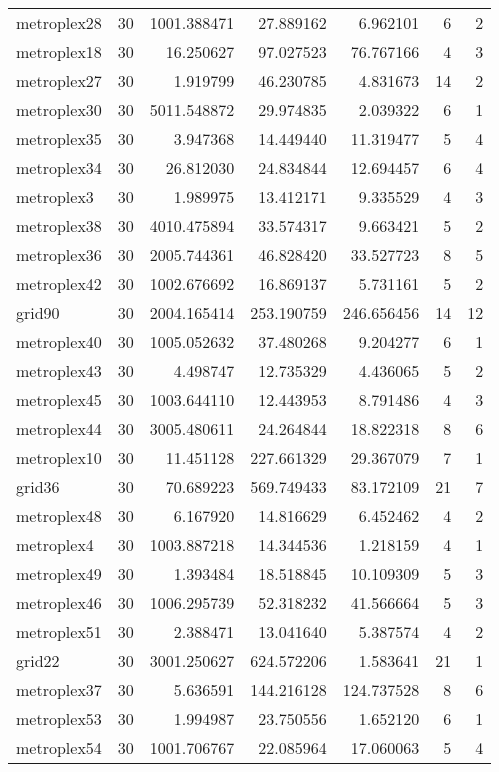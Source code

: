 \begin{longtable}{|l|r|r|r|r|r|r|}
metroplex28 & 30 & 1001.388471 & 27.889162 & 6.962101 & 6 & 2 \\
metroplex18 & 30 & 16.250627 & 97.027523 & 76.767166 & 4 & 3 \\
metroplex27 & 30 & 1.919799 & 46.230785 & 4.831673 & 14 & 2 \\
metroplex30 & 30 & 5011.548872 & 29.974835 & 2.039322 & 6 & 1 \\
metroplex35 & 30 & 3.947368 & 14.449440 & 11.319477 & 5 & 4 \\
metroplex34 & 30 & 26.812030 & 24.834844 & 12.694457 & 6 & 4 \\
metroplex3 & 30 & 1.989975 & 13.412171 & 9.335529 & 4 & 3 \\
metroplex38 & 30 & 4010.475894 & 33.574317 & 9.663421 & 5 & 2 \\
metroplex36 & 30 & 2005.744361 & 46.828420 & 33.527723 & 8 & 5 \\
metroplex42 & 30 & 1002.676692 & 16.869137 & 5.731161 & 5 & 2 \\
grid90 & 30 & 2004.165414 & 253.190759 & 246.656456 & 14 & 12 \\
metroplex40 & 30 & 1005.052632 & 37.480268 & 9.204277 & 6 & 1 \\
metroplex43 & 30 & 4.498747 & 12.735329 & 4.436065 & 5 & 2 \\
metroplex45 & 30 & 1003.644110 & 12.443953 & 8.791486 & 4 & 3 \\
metroplex44 & 30 & 3005.480611 & 24.264844 & 18.822318 & 8 & 6 \\
metroplex10 & 30 & 11.451128 & 227.661329 & 29.367079 & 7 & 1 \\
grid36 & 30 & 70.689223 & 569.749433 & 83.172109 & 21 & 7 \\
metroplex48 & 30 & 6.167920 & 14.816629 & 6.452462 & 4 & 2 \\
metroplex4 & 30 & 1003.887218 & 14.344536 & 1.218159 & 4 & 1 \\
metroplex49 & 30 & 1.393484 & 18.518845 & 10.109309 & 5 & 3 \\
metroplex46 & 30 & 1006.295739 & 52.318232 & 41.566664 & 5 & 3 \\
metroplex51 & 30 & 2.388471 & 13.041640 & 5.387574 & 4 & 2 \\
grid22 & 30 & 3001.250627 & 624.572206 & 1.583641 & 21 & 1 \\
metroplex37 & 30 & 5.636591 & 144.216128 & 124.737528 & 8 & 6 \\
metroplex53 & 30 & 1.994987 & 23.750556 & 1.652120 & 6 & 1 \\
metroplex54 & 30 & 1001.706767 & 22.085964 & 17.060063 & 5 & 4 \\

\end{longtable}
